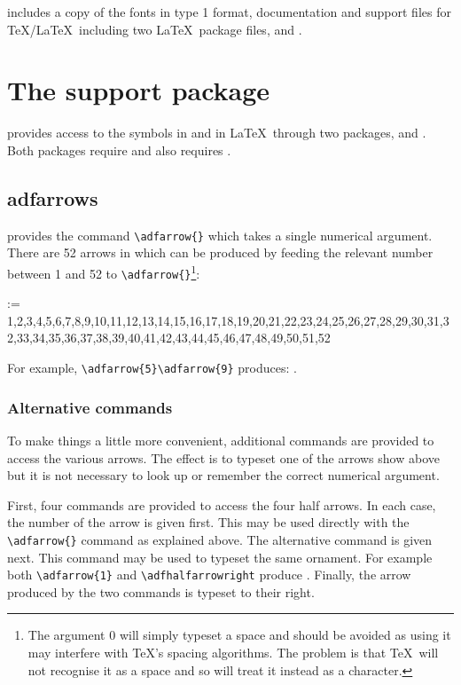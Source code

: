 \documentclass[10pt,british]{article}
\makeatletter
\newcommand{\adfsymset}{%
1,2,3,4,5,6,7,8,9,10,11,12,13,14,15,16,17,18,19,20,21,22,23,24,25,26,27,28,29,30,31,32,33,34,35,36,37,38,39,40,41,42,43,44,45,46,47,48,49,50,51,52}
\newcommand{\adfarrowshow}{%
	\def\tempa{52}%
	\@for \xx:=\adfsymset \do {%
		\ifx\tempa\xx
			\xx: \adfarrow{\xx}%
		\else
			\xx:	 \adfarrow{\xx}\\%
		\fi}}
\makeatother
\begin{document}
 includes a copy of the fonts in type 1 format, documentation and support files for \TeX/\LaTeX\, including two \LaTeX\ package files,  and .

\section{The support package}\label{sec:support}

 provides access to the symbols in  and  in \LaTeX\ through two packages,  and . Both packages require  and  also requires .

\subsection{adfarrows}

 provides the command \verb|\adfarrow{}| which takes a single numerical argument. There are 52 arrows in  which can be produced by feeding the relevant number between 1 and 52 to \verb|\adfarrow{}|\footnote{The argument 0 will simply typeset a space and should be avoided as using it may interfere with \TeX's spacing algorithms. The problem is that \TeX\ will not recognise it as a space and so will treat it instead as a character.}:
\begin{multicols}{4}	%
	\adfarrowshow	
\end{multicols}

For example, \verb|\adfarrow{5}\adfarrow{9}| produces: 	.

\subsubsection{Alternative commands}

To make things a little more convenient, additional commands are provided to access the various arrows. The effect is to typeset one of the arrows show above but it is not necessary to look up or remember the correct numerical argument.

First, four commands are provided to access the four half arrows. In each case, the number of the arrow is given first. This may be used directly with the \verb|\adfarrow{}| command as explained above. The alternative command is given next. This command may be used to typeset the same ornament. For example both \verb|\adfarrow{1}| and \verb|\adfhalfarrowright| produce \adfhalfarrowright. Finally, the arrow produced by the two commands is typeset to their right.
\end{document}
